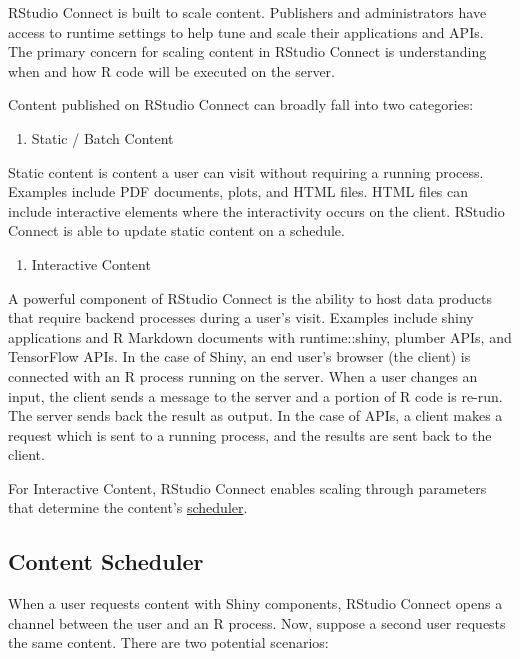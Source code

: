 \documentclass[]{book}
\providecommand{\tightlist}{%
  \setlength{\itemsep}{0pt}\setlength{\parskip}{0pt}}
\theoremstyle{definition}
\theoremstyle{definition}
\theoremstyle{definition}
\theoremstyle{remark}
\begin{document}
RStudio Connect is built to scale content. Publishers and administrators
have access to runtime settings to help tune and scale their
applications and APIs. The primary concern for scaling content in
RStudio Connect is understanding when and how R code will be executed on
the server.

Content published on RStudio Connect can broadly fall into two
categories:

\begin{enumerate}
\def\labelenumi{\arabic{enumi}.}
\tightlist
\item
  Static / Batch Content
\end{enumerate}

Static content is content a user can visit without requiring a running
process. Examples include PDF documents, plots, and HTML files. HTML
files can include interactive elements where the interactivity occurs on
the client. RStudio Connect is able to update static content on a
schedule.

\begin{enumerate}
\def\labelenumi{\arabic{enumi}.}
\setcounter{enumi}{1}
\tightlist
\item
  Interactive Content
\end{enumerate}

A powerful component of RStudio Connect is the ability to host data
products that require backend processes during a user's visit. Examples
include shiny applications and R Markdown documents with runtime::shiny,
plumber APIs, and TensorFlow APIs. In the case of Shiny, an end user's
browser (the client) is connected with an R process running on the
server. When a user changes an input, the client sends a message to the
server and a portion of R code is re-run. The server sends back the
result as output. In the case of APIs, a client makes a request which is
sent to a running process, and the results are sent back to the client.

For Interactive Content, RStudio Connect enables scaling through
parameters that determine the content's
\href{https://docs.rstudio.com/connect/admin/appendix-configuration.html\#appendix-configuration-scheduler}{scheduler}.

\hypertarget{content-scheduler}{%
\subsection{Content Scheduler}\label{content-scheduler}}

When a user requests content with Shiny components, RStudio Connect
opens a channel between the user and an R process. Now, suppose a second
user requests the same content. There are two potential scenarios:
\end{document}
